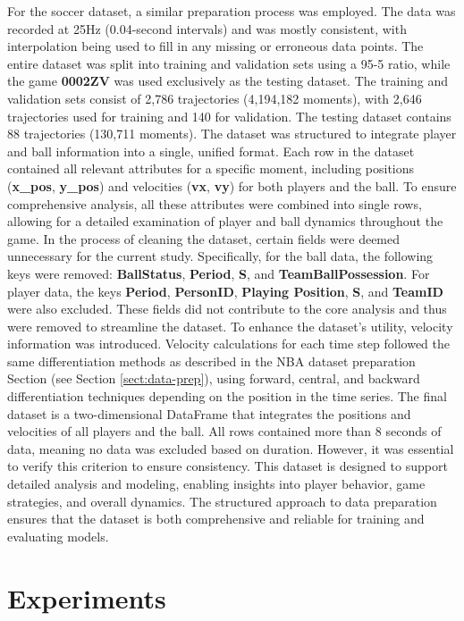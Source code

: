 For the soccer dataset, a similar preparation process was employed. The data was recorded at 25Hz (0.04-second intervals) and was mostly consistent, with interpolation being used to fill in any missing or erroneous data points. The entire dataset was split into training and validation sets using a 95-5 ratio, while the game \textbf{0002ZV} was used exclusively as the testing dataset. The training and validation sets consist of 2,786 trajectories (4,194,182 moments), with 2,646 trajectories used for training and 140 for validation. The testing dataset contains 88 trajectories (130,711 moments). The dataset was structured to integrate player and ball information into a single, unified format. Each row in the dataset contained all relevant attributes for a specific moment, including positions (\textbf{x\_pos}, \textbf{y\_pos}) and velocities (\textbf{vx}, \textbf{vy}) for both players and the ball. To ensure comprehensive analysis, all these attributes were combined into single rows, allowing for a detailed examination of player and ball dynamics throughout the game. In the process of cleaning the dataset, certain fields were deemed unnecessary for the current study. Specifically, for the ball data, the following keys were removed: \textbf{BallStatus}, \textbf{Period}, \textbf{S}, and \textbf{TeamBallPossession}. For player data, the keys \textbf{Period}, \textbf{PersonID}, \textbf{Playing Position}, \textbf{S}, and \textbf{TeamID} were also excluded. These fields did not contribute to the core analysis and thus were removed to streamline the dataset. To enhance the dataset's utility, velocity information was introduced. Velocity calculations for each time step followed the same differentiation methods as described in the NBA dataset preparation Section (see Section \ref{sect:data-prep}), using forward, central, and backward differentiation techniques depending on the position in the time series.
The final dataset is a two-dimensional DataFrame that integrates the positions and velocities of all players and the ball. All rows contained more than 8 seconds of data, meaning no data was excluded based on duration. However, it was essential to verify this criterion to ensure consistency. This dataset is designed to support detailed analysis and modeling, enabling insights into player behavior, game strategies, and overall dynamics. The structured approach to data preparation ensures that the dataset is both comprehensive and reliable for training and evaluating models.



\section{Experiments}
\label{sec:experiments}

